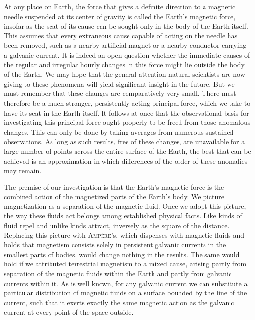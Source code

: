 At any place on Earth, the force that gives a definite direction to a magnetic needle suspended at its center of gravity is called the Earth's magnetic force, insofar as the seat of its cause can be sought only in the body of the Earth itself. This assumes that every extraneous cause capable of acting on the needle has been removed, such as a nearby artificial magnet or a nearby conductor carrying a galvanic current. It is indeed an open question whether the immediate causes of the regular and irregular hourly changes in this force might lie outside the body of the Earth. We may hope that the general attention natural scientists are now giving to these phenomena will yield significant insight in the future. But we must remember that these changes are comparatively very small. There must therefore be a much stronger, persistently acting principal force, which we take to have its seat in the Earth itself. It follows at once that the observational basis for investigating this principal force ought properly to be freed from those anomalous changes. This can only be done by taking averages from numerous sustained observations. As long as such results, free of these changes, are unavailable for a large number of points across the entire surface of the Earth, the best that can be achieved is an approximation in which differences of the order of these anomalies may remain.

The premise of our investigation is that the Earth's magnetic force is the combined action of the magnetized parts of the Earth's body. We picture magnetization as a separation of the magnetic fluid. Once we adopt this picture, the way these fluids act belongs among established physical facts. Like kinds of fluid repel and unlike kinds attract, inversely as the square of the distance. Replacing this picture with \textsc{Ampère}'s, which dispenses with magnetic fluids and holds that magnetism consists solely in persistent galvanic currents in the smallest parts of bodies, would change nothing in the results. The same would hold if we attributed terrestrial magnetism to a mixed cause, arising partly from separation of the magnetic fluids within the Earth and partly from galvanic currents within it. As is well known, for any galvanic current we can substitute a particular distribution of magnetic fluids on a surface bounded by the line of the current, such that it exerts exactly the same magnetic action as the galvanic current at every point of the space outside.

